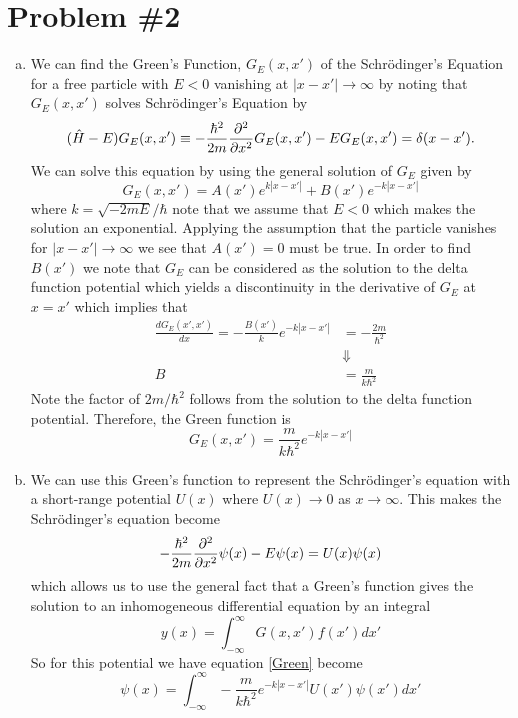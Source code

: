 \documentclass[11pt]{article}
\numberwithin{equation}{section}
\begin{document}
\section{Problem \#2}
\begin{enumerate}[(a)]
\item We can find the Green's Function, $G_E(x,x')$ of the Schr\"{o}dinger's Equation for a
free particle with $E<0$ vanishing at $|x-x'|\rightarrow\infty$ by noting that $G_E(x,x')$
solves Schr\"{o}dinger's Equation by
$$(\hat{H}-E)G_E(x,x')\equiv-\frac{\hbar^2}{2m}\frac{\partial{^2}}{\partial{x^2}}G_E(x,x')-EG_E(x,x') = \delta(x-x').$$
We can solve this equation by using the general solution of $G_E$ given by
$$G_E(x,x') = A(x')e^{k|x-x'|} + B(x')e^{-k|x-x'|}$$
where $k=\sqrt{-2mE}/\hbar$ note that we assume that $E<0$ which makes the solution an 
exponential. Applying the assumption that the particle vanishes for $|x-x'|\rightarrow\infty$
we see that $A(x')=0$ must be true. In order to find $B(x')$ we note that $G_E$ can be 
considered as the solution to the delta function potential which yields a discontinuity in 
the derivative of $G_E$ at $x=x'$ which implies that
\begin{align*}
\frac{dG_E(x',x')}{dx} = -\frac{B(x')}{k}e^{-k|x-x'|} &= -\frac{2m}{\hbar^2}\\
&\Downarrow\\
B &= \frac{m}{k\hbar^2}
\end{align*}
Note the factor of $2m/\hbar^2$ follows from the solution to the delta function potential. 
Therefore, the Green function is 
$$G_E(x,x') = \frac{m}{k\hbar^2}e^{-k|x-x'|}$$

\item We can use this Green's function to represent the Schr\"{o}dinger's equation with a
short-range potential $U(x)$ where $U(x)\rightarrow0$ as $x\rightarrow\infty$. This makes the
Schr\"{o}dinger's equation become
$$-\frac{\hbar^2}{2m}\frac{\partial{^2}}{\partial{x^2}}\psi(x)-E\psi(x) = U(x)\psi(x)$$
which allows us to use the general fact that a Green's function gives the solution to an
inhomogeneous differential equation by an integral
\begin{equation}
y(x) = \int_{-\infty}^{\infty}G(x,x')f(x')dx'
\label{Green}
\end{equation}
So for this potential we have equation \ref{Green} become
$$\psi(x) = \int_{-\infty}^{\infty}-\frac{m}{k\hbar^2}e^{-k|x-x'|}U(x')\psi(x')dx'$$


\end{enumerate}
\end{document}
